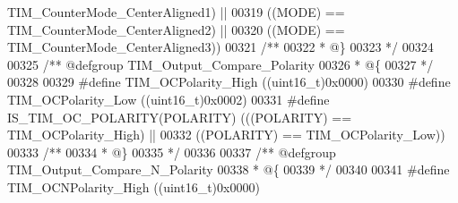 \begin{DoxyCode}
      TIM_CounterMode_CenterAligned1\textcolor{preprocessor}{)} \textcolor{preprocessor}{||}
00319                                    \textcolor{preprocessor}{(}\textcolor{preprocessor}{(}\textcolor{preprocessor}{MODE}\textcolor{preprocessor}{)} \textcolor{preprocessor}{==} 
      TIM_CounterMode_CenterAligned2\textcolor{preprocessor}{)} \textcolor{preprocessor}{||}
00320                                    \textcolor{preprocessor}{(}\textcolor{preprocessor}{(}\textcolor{preprocessor}{MODE}\textcolor{preprocessor}{)} \textcolor{preprocessor}{==} 
      TIM_CounterMode_CenterAligned3\textcolor{preprocessor}{)}\textcolor{preprocessor}{)}
00321 \textcolor{comment}{/**}
00322 \textcolor{comment}{  * @\}}
00323 \textcolor{comment}{  */}
00324 
00325 \textcolor{comment}{/** @defgroup TIM\_Output\_Compare\_Polarity }
00326 \textcolor{comment}{  * @\{}
00327 \textcolor{comment}{  */}
00328 
00329 \textcolor{preprocessor}{#}\textcolor{preprocessor}{define} \textcolor{preprocessor}{TIM\_OCPolarity\_High}                \textcolor{preprocessor}{(}\textcolor{preprocessor}{(}\textcolor{preprocessor}{uint16\_t}\textcolor{preprocessor}{)}0x0000\textcolor{preprocessor}{)}
00330 \textcolor{preprocessor}{#}\textcolor{preprocessor}{define} \textcolor{preprocessor}{TIM\_OCPolarity\_Low}                 \textcolor{preprocessor}{(}\textcolor{preprocessor}{(}\textcolor{preprocessor}{uint16\_t}\textcolor{preprocessor}{)}0x0002\textcolor{preprocessor}{)}
00331 \textcolor{preprocessor}{#}\textcolor{preprocessor}{define} \textcolor{preprocessor}{IS\_TIM\_OC\_POLARITY}\textcolor{preprocessor}{(}\textcolor{preprocessor}{POLARITY}\textcolor{preprocessor}{)} \textcolor{preprocessor}{(}\textcolor{preprocessor}{(}\textcolor{preprocessor}{(}\textcolor{preprocessor}{POLARITY}\textcolor{preprocessor}{)} \textcolor{preprocessor}{==} TIM_OCPolarity_High\textcolor{preprocessor}{)} \textcolor{preprocessor}{||}
00332                                       \textcolor{preprocessor}{(}\textcolor{preprocessor}{(}\textcolor{preprocessor}{POLARITY}\textcolor{preprocessor}{)} \textcolor{preprocessor}{==} TIM_OCPolarity_Low\textcolor{preprocessor}{)}\textcolor{preprocessor}{)}
00333 \textcolor{comment}{/**}
00334 \textcolor{comment}{  * @\}}
00335 \textcolor{comment}{  */}
00336 
00337 \textcolor{comment}{/** @defgroup TIM\_Output\_Compare\_N\_Polarity }
00338 \textcolor{comment}{  * @\{}
00339 \textcolor{comment}{  */}
00340 
00341 \textcolor{preprocessor}{#}\textcolor{preprocessor}{define} \textcolor{preprocessor}{TIM\_OCNPolarity\_High}               \textcolor{preprocessor}{(}\textcolor{preprocessor}{(}\textcolor{preprocessor}{uint16\_t}\textcolor{preprocessor}{)}0x0000\textcolor{preprocessor}{)}

\end{DoxyCode}
